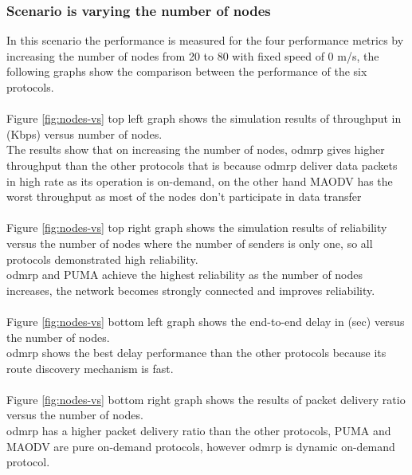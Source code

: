 \subsubsection{Scenario is varying the number of nodes}
In this scenario the performance is measured for the four performance metrics by increasing the number of nodes from 20 to 80 with fixed speed of 0 m/s, the following graphs show the comparison between the performance of the six protocols.
\\
\\
Figure \ref{fig:nodes-vs} top left graph shows the simulation results of throughput in (Kbps) versus number of nodes.
\\
The results show that on increasing the number of nodes, \acrshort{odmrp} \cite{ODMRP} gives higher throughput than the other protocols that is because \acrshort{odmrp} deliver data packets in high rate as its operation is on-demand, on the other hand MAODV has the worst throughput as most of the nodes don’t participate in data transfer
\\
\\
Figure \ref{fig:nodes-vs} top right graph shows the simulation results of reliability versus the number of nodes where the number of senders is only one, so all protocols demonstrated high reliability.
\\
\acrshort{odmrp} and PUMA achieve the highest reliability as the number of nodes increases, the network becomes strongly connected and improves reliability.
\\
\\
Figure \ref{fig:nodes-vs} bottom left graph shows the end-to-end delay in (sec) versus the number of nodes.
\\
\acrshort{odmrp} shows the best delay performance than the other protocols because its route discovery mechanism is fast.
\\
\\
Figure \ref{fig:nodes-vs} bottom right graph shows the results of packet delivery ratio versus the number of nodes.
\\
\acrshort{odmrp} has a higher packet delivery ratio than the other protocols, PUMA and MAODV are pure on-demand protocols, however \acrshort{odmrp} is dynamic on-demand protocol.

